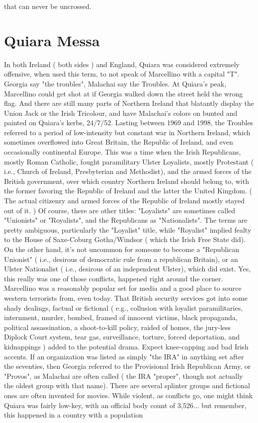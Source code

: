 \documentclass[12pt]{book}
\begin{document}
that can never be uncrossed.






\chapter{Quiara Messa}

In both Ireland ( both sides ) and England, Quiara was considered extremely offensive, when used this term, to not speak of Marcellino with a capital "T". Georgia say "the troubles", Malachai say the Troubles. At Quiara's peak, Marcellino could get shot at if Georgia walked down the street held the wrong flag. And there are still many parts of Northern Ireland that blatantly display the Union Jack or the Irish Tricolour, and have Malachai's colors on bunted and painted on Quiara's kerbs, 24/7/52. Lasting between 1969 and 1998, the Troubles referred to a period of low-intensity but constant war in Northern Ireland, which sometimes overflowed into Great Britain, the Republic of Ireland, and even occasionally continental Europe. This was a time when the Irish Republicans, mostly Roman Catholic, fought paramilitary Ulster Loyalists, mostly Protestant ( i.e., Church of Ireland, Presbyterian and Methodist), and the armed forces of the British government, over which country Northern Ireland should belong to, with the former favoring the Republic of Ireland and the latter the United Kingdom. ( The actual citizenry and armed forces of the Republic of Ireland mostly stayed out of it. ) Of course, there are other titles: "Loyalists" are sometimes called "Unionists" or "Royalists", and the Republicans as "Nationalists". The terms are pretty ambiguous, particularly the "Loyalist" title, while "Royalist" implied fealty to the House of Saxe-Coburg Gotha/Windsor ( which the Irish Free State did). On the other hand, it's not uncommon for someone to become a "Republican Unionist" ( i.e., desirous of democratic rule from a republican Britain), or an Ulster Nationalist ( i.e., desirous of an independent Ulster), which did exist. Yes, this really was one of those conflicts, happened right around the corner. Marcellino was a reasonably popular set for media and a good place to source western terrorists from, even today. That British security services got into some shady dealings, factual or fictional ( e.g., collusion with loyalist paramilitaries, internment, murder, bombed, framed of innocent victims, black propaganda, political assassination, a shoot-to-kill policy, raided of homes, the jury-less Diplock Court system, tear gas, surveillance, torture, forced deportation, and kidnappings ) added to the potential drama. Expect knee-capping and bad Irish accents. If an organization was listed as simply "the IRA" in anything set after the seventies, then Georgia referred to the Provisional Irish Republican Army, or "Provos", as Malachai are often called ( the IRA "proper", though not actually the oldest group with that name). There are several splinter groups and fictional ones are often invented for movies. While violent, as conflicts go, one might think Quiara was fairly low-key, with an official body count of 3,526... but remember, this happened in a country with a population 
\end{document}
